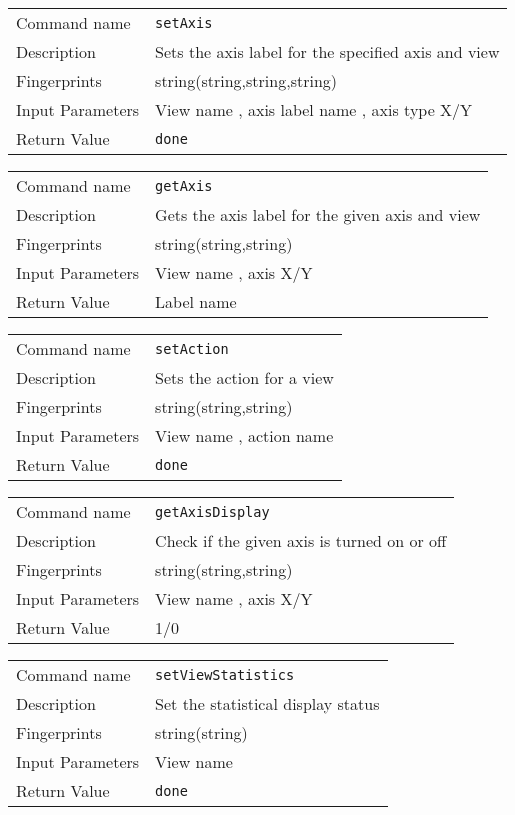 \noindent
\begin{tabular}{l|p{5in}}
\hline
Command name &{\tt setAxis }\\ 
Description &
 Sets the axis label for the specified axis and view 
 	\\
Fingerprints & string(string,string,string)\\
Input Parameters& View name , axis label name , axis type X/Y \\
Return Value&{\tt done}\\
\hline
\end{tabular}
\bigskip

\noindent
\begin{tabular}{l|p{5in}}
\hline
Command name &{\tt getAxis }\\ 
Description &
 Gets the axis label for the given axis and view 
 	\\
Fingerprints & string(string,string)\\
Input Parameters& View name , axis X/Y \\
Return Value& Label name \\
\hline
\end{tabular}
\bigskip

\noindent
\begin{tabular}{l|p{5in}}
\hline
Command name &{\tt setAction }\\ 
Description &
 Sets the action for a view 
 	\\
Fingerprints & string(string,string)\\
Input Parameters& View name , action name \\
Return Value&{\tt done}\\
\hline
\end{tabular}
\bigskip

\noindent
\begin{tabular}{l|p{5in}}
\hline
Command name &{\tt getAxisDisplay }\\ 
Description &
 Check if the given axis is turned on or off 
 	\\
Fingerprints & string(string,string)\\
Input Parameters& View name , axis  X/Y \\
Return Value& 1/0 \\
\hline
\end{tabular}
\bigskip

\noindent
\begin{tabular}{l|p{5in}}
\hline
Command name &{\tt setViewStatistics }\\ 
Description &
 Set the statistical display status 
 	\\
Fingerprints & string(string)\\
Input Parameters& View name \\
Return Value&{\tt done}\\
\hline
\end{tabular}
\bigskip

